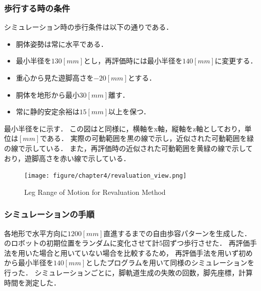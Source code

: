 \subsubsection{歩行する時の条件}
シミュレーション時の歩行条件は以下の通りである．
\begin{itemize}
  \item 胴体姿勢は常に水平である．
  \item 最小半径を$130 [mm]$とし，再評価時には最小半径を$140 [mm]$に変更する．
  \item 重心から見た遊脚高さを$-20 [mm]$とする．
  \item 胴体を地形から最小$30 [mm]$離す．
  \item 常に静的安定余裕は$15 [mm]$以上を保つ．
\end{itemize}
最小半径をに示す．
この図はと同様に，横軸をx軸，縦軸をz軸としており，単位は$[mm]$である．
実際の可動範囲を黒の線で示し，近似された可動範囲を緑の線で示している．
また，再評価時の近似された可動範囲を黄緑の線で示しており，遊脚高さを赤い線で示している．

\begin{figure}[htbp]
  \centering
  \texttt{[image: figure/chapter4/revaluation\_view.png]}
  \caption{Leg Range of Motion for Revaluation Method}
  \label{fig:ch5_range_revaluation} %
\end{figure}

\subsubsection{シミュレーションの手順}
各地形で水平方向に$1200 [mm]$直進するまでの自由歩容パターンを生成した．
のロボットの初期位置をランダムに変化させて計5回ずつ歩行させた．
再評価手法を用いた場合と用いていない場合を比較するため，
再評価手法を用いず初めから最小半径を$140 [mm]$としたプログラムを用いて同様のシミュレーションを行った．
シミュレーションごとに，脚軌道生成の失敗の回数，脚先座標，計算時間を測定した．


